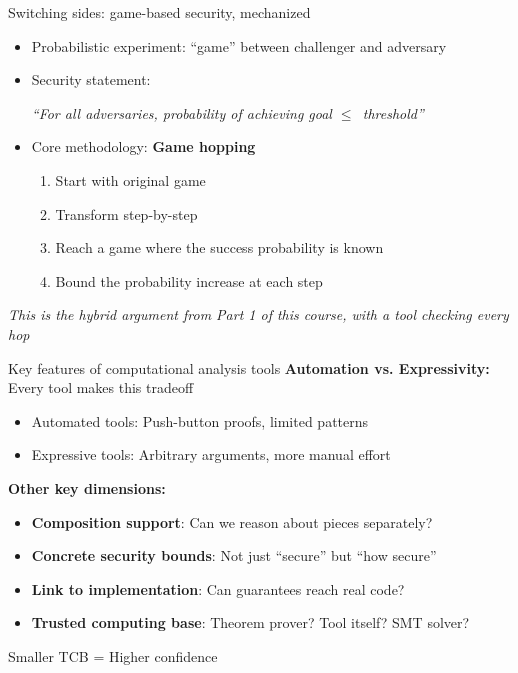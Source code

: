 \ifdefined\PRESENTATION\else\PassOptionsToClass{handout}{beamer}\fi\documentclass[aspectratio=169, lualatex]{beamer}
\begin{document}
\begin{frame}{Switching sides: game-based security, mechanized}
	\begin{itemize}
		\item Probabilistic experiment: ``game'' between challenger and adversary
		\item Security statement:
		      \begin{center}
			      \textit{``For all adversaries, probability of achieving goal $\leq$\ threshold''}
		      \end{center}
		\item Core methodology: \textbf{Game hopping}
		      \begin{enumerate}
			      \item Start with original game
			      \item Transform step-by-step
			      \item Reach a game where the success probability is known
			      \item Bound the probability increase at each step
		      \end{enumerate}
	\end{itemize}
	\vspace{0.5em}
	\begin{center}
		\textit{This is the hybrid argument from Part 1 of this course, with a tool checking every hop}
	\end{center}
\end{frame}

\begin{frame}{Key features of computational analysis tools}
	\textbf{Automation vs. Expressivity:} Every tool makes this tradeoff
	\begin{itemize}
		\item Automated tools: Push-button proofs, limited patterns
		\item Expressive tools: Arbitrary arguments, more manual effort
	\end{itemize}
	\vspace{0.5em}
	\textbf{Other key dimensions:}
	\begin{itemize}
		\item \textbf{Composition support}: Can we reason about pieces separately?
		\item \textbf{Concrete security bounds}: Not just ``secure'' but ``how secure''
		\item \textbf{Link to implementation}: Can guarantees reach real code?
		\item \textbf{Trusted computing base}: Theorem prover? Tool itself? SMT solver?
	\end{itemize}
	\vspace{0.5em}
	\begin{center}
		Smaller TCB = Higher confidence
	\end{center}
\end{frame}
\end{document}
